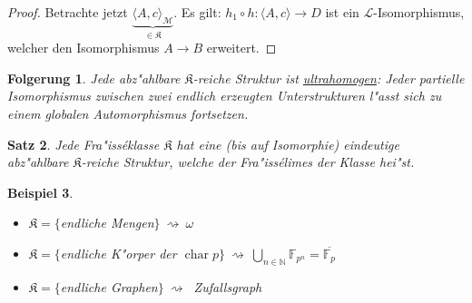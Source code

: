 \documentclass[a4paper,12pt,numbers=noenddot,parskip=full]{scrartcl}
\newcommand{\setN}{\mathbb{N}}
\newcommand{\scrL}{\mathcal{L}}
\newcommand{\scrM}{\mathcal{M}}
\newcommand{\fK}{\mathfrak{K}}
\DeclareMathOperator{\charac}{char}
\theoremstyle{dotless}
\newtheorem{theorem}{Satz}[section]
\newtheorem{corollary}[theorem]{Folgerung}
\newtheorem{example}[theorem]{Beispiel}
\begin{document}
\begin{proof}
	Betrachte jetzt $\underbrace{\langle A, c \rangle_\scrM}_{\in \fK}$. Es gilt: $h_1 \circ h: \langle A, c \rangle \rightarrow D$ ist ein $\scrL$-Isomorphismus, welcher den Isomorphismus $A \rightarrow B$ erweitert.
\end{proof}
\begin{corollary}
	Jede abz"ahlbare $\fK$-reiche Struktur ist \underline{\emph{ultrahomogen}}: Jeder partielle Isomorphismus zwischen zwei endlich erzeugten Unterstrukturen l"asst sich zu einem globalen Automorphismus fortsetzen.
\end{corollary}
\begin{theorem}
	Jede Fra"isséklasse $\fK$ hat eine (bis auf Isomorphie) eindeutige abz"ahlbare $\fK$-reiche Struktur, welche der Fra"issélimes der Klasse hei"st.
\end{theorem}
\begin{example}
	\begin{itemize}
		\item $\fK = \{$endliche Mengen$ \}~ \rightsquigarrow~ \omega$
		\item $\fK = \{$endliche K"orper der $\charac p \}~ \rightsquigarrow~ \bigcup\limits_{n \in \setN} \mathbb{F}_{p^n} = \overline{\mathbb{F}_p}$
		\item $\fK = \{$endliche Graphen$\}~ \rightsquigarrow~$ Zufallsgraph
	\end{itemize}
\end{example}
\end{document}
